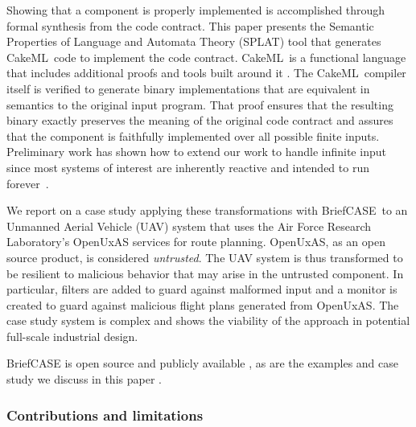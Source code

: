 \documentclass[global,twocolumn]{svjour}
\newcommand{\brfcs}{BriefCASE}
\newcommand{\splt}{SPLAT}
\newcommand{\ckml}{CakeML}
\begin{document}
Showing that a component is properly implemented is accomplished through formal synthesis from the code contract.  This paper presents the Semantic Properties of Language and Automata Theory (\splt) tool that generates \ckml\ code to implement the code contract.
%
\ckml\ is a functional language that includes additional proofs and tools built around it \cite{cakeml}.
%
The \ckml\ compiler itself is verified to generate binary implementations that are equivalent in semantics to the original input program.
%
That proof ensures that the resulting binary exactly preserves the meaning of the original code contract and assures that the component is faithfully implemented over all possible finite inputs.
%
Preliminary work has shown how to extend our work to handle infinite input since most systems of interest are inherently reactive and intended to run forever~\cite{case-verified-filter,cakeml-space-cost}.

We report on a case study applying these transformations with \brfcs\ to an Unmanned Aerial Vehicle (UAV) system that uses the Air Force Research Laboratory's OpenUxAS services for route planning.
%
OpenUxAS, as an open source product, is considered \emph{untrusted}.
%
The UAV system is thus transformed to be resilient to malicious behavior that may arise in the untrusted component.
%
In particular, filters are added to guard against malformed input and a monitor is created to guard against malicious flight plans generated from OpenUxAS.
%
The case study system is complex and shows the viability of the approach in potential full-scale industrial design.

{\brfcs} is open source and publicly available \cite{fmide}, as are the examples and case study we discuss in this paper \cite{repo,
phase2, camkes, case}.


\subsubsection*{Contributions and limitations}
\end{document}

